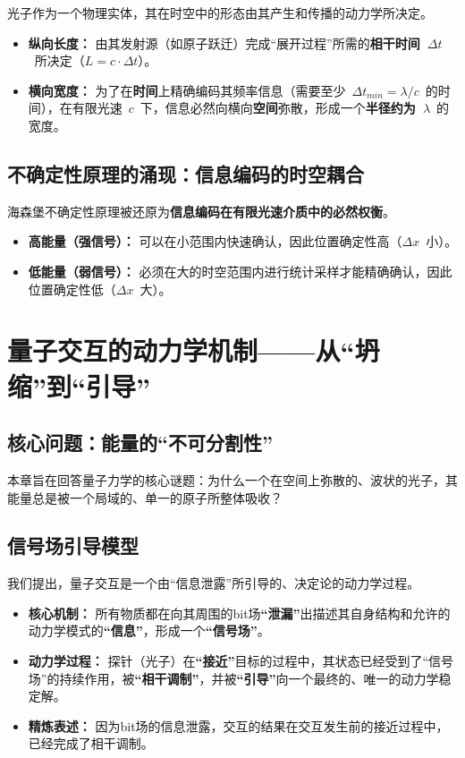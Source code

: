 \documentclass[12pt]{article}
\begin{document}
光子作为一个物理实体，其在时空中的形态由其产生和传播的动力学所决定。

\begin{itemize}
    \item \textbf{纵向长度：} 由其发射源（如原子跃迁）完成``展开过程''所需的\textbf{相干时间~$\Delta t$}~所决定（$L = c \cdot \Delta t$）。
    \item \textbf{横向宽度：} 为了在\textbf{时间}上精确编码其频率信息（需要至少~$\Delta t_{min} = \lambda/c$~的时间），在有限光速~$c$~下，信息必然向横向\textbf{空间}弥散，形成一个\textbf{半径约为~$\lambda$}~的宽度。
\end{itemize}

\subsection{不确定性原理的涌现：信息编码的时空耦合}

海森堡不确定性原理被还原为\textbf{信息编码在有限光速介质中的必然权衡}。

\begin{itemize}
    \item \textbf{高能量（强信号）：} 可以在小范围内快速确认，因此位置确定性高（$\Delta x$~小）。
    \item \textbf{低能量（弱信号）：} 必须在大的时空范围内进行统计采样才能精确确认，因此位置确定性低（$\Delta x$~大）。
\end{itemize}

\section{量子交互的动力学机制——从``坍缩''到``引导''}

\subsection{核心问题：能量的``不可分割性''}

本章旨在回答量子力学的核心谜题：为什么一个在空间上弥散的、波状的光子，其能量总是被一个局域的、单一的原子所整体吸收？

\subsection{信号场引导模型}

我们提出，量子交互是一个由``信息泄露''所引导的、决定论的动力学过程。

\begin{itemize}
    \item \textbf{核心机制：} 所有物质都在向其周围的bit场\textbf{``泄漏''}出描述其自身结构和允许的动力学模式的\textbf{``信息''}，形成一个\textbf{``信号场''}。
    \item \textbf{动力学过程：} 探针（光子）在\textbf{``接近''}目标的过程中，其状态已经受到了``信号场''的持续作用，被\textbf{``相干调制''}，并被\textbf{``引导''}向一个最终的、唯一的动力学稳定解。
    \item \textbf{精炼表述：} 因为bit场的信息泄露，交互的结果在交互发生前的接近过程中，已经完成了相干调制。
\end{itemize}
\end{document}
